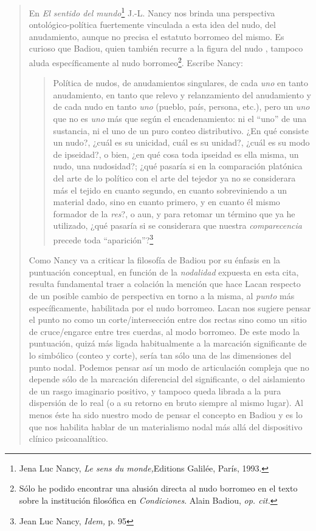 \begin{quote}
En \emph{El sentido del mundo}\footnote{Jena Luc Nancy, \emph{Le sens du monde,}Editions Galilée, París, 1993.} J.-L. Nancy nos brinda una perspectiva ontológico-política fuertemente vinculada a esta idea del nudo, del anudamiento, aunque no precisa el estatuto borromeo del mismo. Es curioso que Badiou, quien también recurre a la figura del nudo , tampoco aluda específicamente al nudo borromeo\footnote{Sólo he podido encontrar una alusión directa al nudo borromeo en el texto sobre la institución filosófica en \emph{Condiciones}. Alain Badiou, \emph{op. cit.}}. Escribe Nancy:

\begin{quote}
Política de nudos, de anudamientos singulares, de cada \emph{uno} en tanto anudamiento, en tanto que relevo y relanzamiento del anudamiento y de cada nudo en tanto \emph{uno} (pueblo, país, persona, etc.), pero un \emph{uno} que no es \emph{uno} más que según el encadenamiento: ni el \enquote{uno} de una sustancia, ni el uno de un puro conteo distributivo. ¿En qué consiste un nudo?, ¿cuál es su unicidad, cuál es su unidad?, ¿cuál es su modo de ipseidad?, o bien, ¿en qué cosa toda ipseidad es ella misma, un nudo, una nudosidad?; ¿qué pasaría si en la comparación platónica del arte de lo político con el arte del tejedor ya no se considerara más el tejido en cuanto segundo, en cuanto sobreviniendo a un material dado, sino en cuanto primero, y en cuanto él mismo formador de la \emph{res}?, o aun, y para retomar un término que ya he utilizado, ¿qué pasaría si se considerara que nuestra \emph{comparecencia} precede toda \enquote{aparición}?\footnote{Jean Luc Nancy, \emph{Idem,} p. 95}
\end{quote}

Como Nancy va a criticar la filosofía de Badiou por su énfasis en la puntuación conceptual, en función de la \emph{nodalidad} expuesta en esta cita, resulta fundamental traer a colación la mención que hace Lacan respecto de un posible cambio de perspectiva en torno a la misma, al \emph{punto} más específicamente, habilitada por el nudo borromeo. Lacan nos sugiere pensar el punto no como un corte/intersección entre dos rectas sino como un sitio de cruce/engarce entre tres cuerdas, al modo borromeo. De este modo la puntuación, quizá más ligada habitualmente a la marcación significante de lo simbólico (conteo y corte), sería tan sólo una de las dimensiones del punto nodal. Podemos pensar así un modo de articulación compleja que no depende sólo de la marcación diferencial del significante, o del aislamiento de un rasgo imaginario positivo, y tampoco queda librada a la pura dispersión de lo real (o a su retorno en bruto siempre al mismo lugar). Al menos éste ha sido nuestro modo de pensar el concepto en Badiou y es lo que nos habilita hablar de un materialismo nodal más allá del dispositivo clínico psicoanalítico.


\end{quote}
